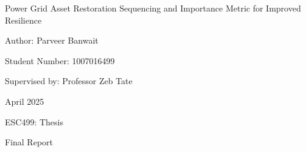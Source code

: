 \documentclass[12pt]{article}
\begin{document}
\setlength{\cftaftertoctitleskip}{2cm} %
\setlength{\cftafterloftitleskip}{2cm} %
\setlength{\cftafterlottitleskip}{2cm} %
\begin{titlepage}
    \centering %
    {\Huge Power Grid Asset Restoration Sequencing and Importance Metric for Improved Resilience \par} %
    \vspace{2cm}
    {\huge Author: Parveer Banwait \par}
    \vspace{0.25cm}
    {\large Student Number: 1007016499 \par}
    \vspace{1cm}
    {\Large Supervised by: Professor Zeb Tate \par}
    \vfill %
    {\Large April 2025 \par}
    \vspace{0.25cm}
    {\Large ESC499: Thesis \par}
    \vspace{0.25cm}
    {\Large Final Report \par}
\end{titlepage}
\vspace*{\fill}
\begin{abstract}
\begin{spacing}{1.0}
Extreme weather continues to impact power system operations, as demonstrated by a recent Ontario ice storm, which left almost 400,000 people without power. This problem is expected to worsen due to climate change. In response, this paper proposes two methods for improving power system resilience. In the short term, pruning methods were developed to determine the optimal repair sequence for grid assets damaged by extreme weather, minimizing the event's impact. For smaller sets of damaged assets, these methods provided near-optimal solutions. Additionally, different pruning methods provide varying levels computational costs and efficacy to be used in different use cases. In the long term, an asset importance metric, which gives the importance of hardening assets against the threat of extreme weather is presented to efficiently allocate grid improvement resources. Using a semi-realistic tornado generator and fragility analysis, we applied this metric to assets in a mock grid representing Texas’s power grid, as a proof of concept. The results show that importance values for transmission lines can be calculated within one week of simulation.
\end{spacing}
\end{abstract}
\end{document}
